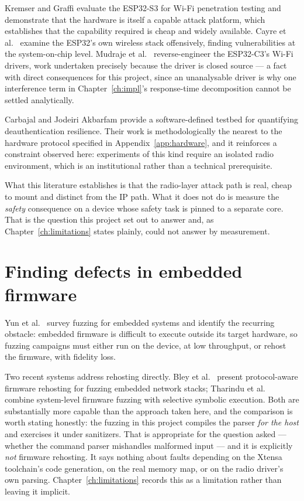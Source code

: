 Kremser and Graffi \cite{deauther2026} evaluate the ESP32-S3 for Wi-Fi penetration testing and
demonstrate that the hardware is itself a capable attack platform, which establishes that the
capability required is cheap and widely available. Cayre et al.\ \cite{espwn2023} examine the
ESP32's own wireless stack offensively, finding vulnerabilities at the system-on-chip level.
Mudraje et al.\ \cite{esp32c3re2025} reverse-engineer the ESP32-C3's Wi-Fi drivers, work
undertaken precisely because the driver is closed source — a fact with direct consequences for
this project, since an unanalysable driver is why one interference term in
Chapter~\ref{ch:impl}'s response-time decomposition cannot be settled analytically.

Carbajal and Jodeiri Akbarfam \cite{carbajal2026} provide a software-defined testbed for
quantifying deauthentication resilience. Their work is methodologically the nearest to the
hardware protocol specified in Appendix~\ref{app:hardware}, and it reinforces a constraint
observed here: experiments of this kind require an isolated radio environment, which is an
institutional rather than a technical prerequisite.

What this literature establishes is that the radio-layer attack path is real, cheap to mount
and distinct from the IP path. What it does not do is measure the \emph{safety} consequence on
a device whose safety task is pinned to a separate core. That is the question this project set
out to answer and, as Chapter~\ref{ch:limitations} states plainly, could not answer by
measurement.

\section{Finding defects in embedded firmware}

Yun et al.\ \cite{fuzzsurvey2022} survey fuzzing for embedded systems and identify the
recurring obstacle: embedded firmware is difficult to execute outside its target hardware, so
fuzzing campaigns must either run on the device, at low throughput, or rehost the firmware,
with fidelity loss.

Two recent systems address rehosting directly. Bley et al.\ \cite{pemu2025} present
protocol-aware firmware rehosting for fuzzing embedded network stacks; Tharindu et al.\
\cite{sysfuss2026} combine system-level firmware fuzzing with selective symbolic execution.
Both are substantially more capable than the approach taken here, and the comparison is worth
stating honestly: the fuzzing in this project compiles the parser \emph{for the host} and
exercises it under sanitizers. That is appropriate for the question asked — whether the command
parser mishandles malformed input — and it is explicitly \emph{not} firmware rehosting. It
says nothing about faults depending on the Xtensa toolchain's code generation, on the real
memory map, or on the radio driver's own parsing. Chapter~\ref{ch:limitations} records this as a
limitation rather than leaving it implicit.

